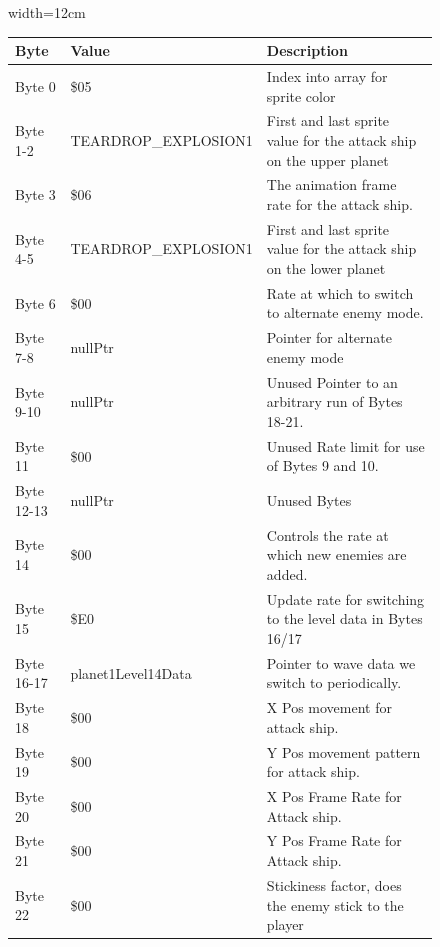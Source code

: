\begin{figure}[H]
{\begin{adjustbox}{width=12cm}
\begin{tabular}{lll}
\toprule
 Byte       & Value               & Description                                                         \\
\midrule
 Byte 0     & \$05                 & Index into array for sprite color                                   \\
 Byte 1-2   & TEARDROP\_EXPLOSION1 & First and last sprite value for the attack ship on the upper planet \\
 Byte 3     & \$06                 & The animation frame rate for the attack ship.                       \\
 Byte 4-5   & TEARDROP\_EXPLOSION1 & First and last sprite value for the attack ship on the lower planet \\
 Byte 6     & \$00                 & Rate at which to switch to alternate enemy mode.                    \\
 Byte 7-8   & nullPtr             & Pointer for alternate enemy mode                                    \\
 Byte 9-10  & nullPtr             & Unused Pointer to an arbitrary run of Bytes 18-21.                  \\
 Byte 11    & \$00                 & Unused Rate limit for use of Bytes 9 and 10.                        \\
 Byte 12-13 & nullPtr             & Unused Bytes                                                        \\
 Byte 14    & \$00                 & Controls the rate at which new enemies are added.                   \\
 Byte 15    & \$E0                 & Update rate for switching to the level data in Bytes 16/17          \\
 Byte 16-17 & planet1Level14Data  & Pointer to wave data we switch to periodically.                     \\
 Byte 18    & \$00                 & X Pos movement for attack ship.                                     \\
 Byte 19    & \$00                 & Y Pos movement pattern for attack ship.                             \\
 Byte 20    & \$00                 & X Pos Frame Rate for Attack ship.                                   \\
 Byte 21    & \$00                 & Y Pos Frame Rate for Attack ship.                                   \\
 Byte 22    & \$00                 & Stickiness factor, does the enemy stick to the player               \\

\end{tabular}
\end{adjustbox}}
\end{figure}
